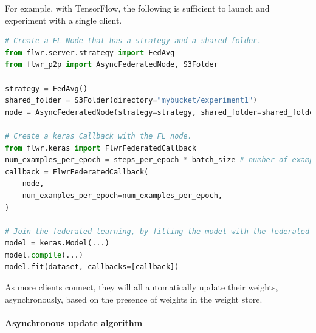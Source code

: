 \documentclass[twocolumn, switch]{article} %
\begin{document}
For example, with TensorFlow, the following is sufficient to launch and experiment with a single client. 

\begin{lstlisting}[language=Python]
# Create a FL Node that has a strategy and a shared folder.
from flwr.server.strategy import FedAvg
from flwr_p2p import AsyncFederatedNode, S3Folder

strategy = FedAvg()
shared_folder = S3Folder(directory="mybucket/experiment1")
node = AsyncFederatedNode(strategy=strategy, shared_folder=shared_folder)

# Create a keras Callback with the FL node.
from flwr.keras import FlwrFederatedCallback
num_examples_per_epoch = steps_per_epoch * batch_size # number of examples used in each epoch
callback = FlwrFederatedCallback(
    node,
    num_examples_per_epoch=num_examples_per_epoch,
)

# Join the federated learning, by fitting the model with the federated callback.
model = keras.Model(...)
model.compile(...)
model.fit(dataset, callbacks=[callback])
\end{lstlisting}

As more clients connect, they will all automatically update their weights, asynchronously, based on the presence of weights in the weight store.

\paragraph{Asynchronous update algorithm}
\end{document}
